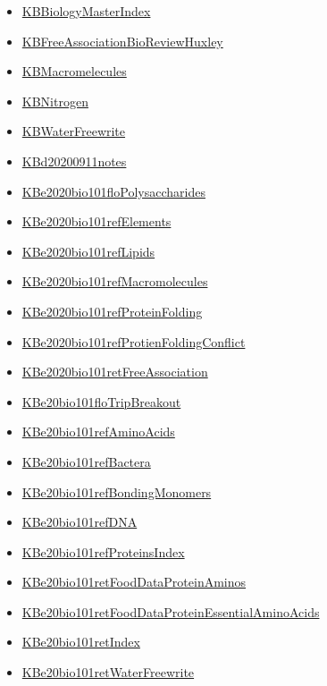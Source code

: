 \documentclass[11pt]{article}
\begin{document}
\begin{itemize}
\begin{itemize}
\item \href{bio101/KBBiologyMasterIndex.org}{KBBiologyMasterIndex}
\item \href{bio101/KBFreeAssociationBioReviewHuxley.org}{KBFreeAssociationBioReviewHuxley}
\item \href{bio101/KBMacromelecules.org}{KBMacromelecules}
\item \href{bio101/KBNitrogen.org}{KBNitrogen}
\item \href{bio101/KBWaterFreewrite.org}{KBWaterFreewrite}
\item \href{bio101/KBd20200911notes.org}{KBd20200911notes}
\item \href{bio101/KBe2020bio101floPolysaccharides.org}{KBe2020bio101floPolysaccharides}
\item \href{bio101/KBe2020bio101refElements.org}{KBe2020bio101refElements}
\item \href{bio101/KBe2020bio101refLipids.org}{KBe2020bio101refLipids}
\item \href{bio101/KBe2020bio101refMacromolecules.org}{KBe2020bio101refMacromolecules}
\item \href{bio101/KBe2020bio101refProteinFolding.org}{KBe2020bio101refProteinFolding}
\item \href{bio101/KBe2020bio101refProtienFoldingConflict.org}{KBe2020bio101refProtienFoldingConflict}
\item \href{bio101/KBe2020bio101retFreeAssociation.org}{KBe2020bio101retFreeAssociation}
\item \href{bio101/KBe20bio101floTripBreakout.org}{KBe20bio101floTripBreakout}
\item \href{bio101/KBe20bio101refAminoAcids.org}{KBe20bio101refAminoAcids}
\item \href{bio101/KBe20bio101refBactera.org}{KBe20bio101refBactera}
\item \href{bio101/KBe20bio101refBondingMonomers.org}{KBe20bio101refBondingMonomers}
\item \href{bio101/KBe20bio101refDNA.org}{KBe20bio101refDNA}
\item \href{bio101/KBe20bio101refProteinsIndex.org}{KBe20bio101refProteinsIndex}
\item \href{bio101/KBe20bio101retFoodDataProteinAminos.org}{KBe20bio101retFoodDataProteinAminos}
\item \href{bio101/KBe20bio101retFoodDataProteinEssentialAminoAcids.org}{KBe20bio101retFoodDataProteinEssentialAminoAcids}
\item \href{bio101/KBe20bio101retIndex.org}{KBe20bio101retIndex}
\item \href{bio101/KBe20bio101retWaterFreewrite.org}{KBe20bio101retWaterFreewrite}

\end{itemize}
\end{itemize}
\end{document}
